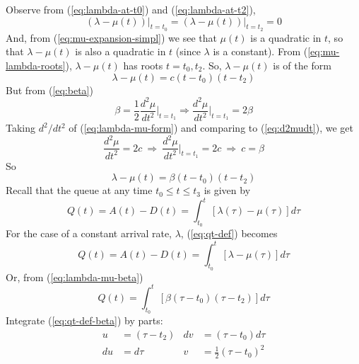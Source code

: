 \documentclass[12pt]{report}
\newcounter{time}
\begin{document}
Observe from (\ref{eq:lambda-at-t0}) and (\ref{eq:lambda-at-t2}),
\begin{equation}
  \label{eq:mu-lambda-roots}
  (\lambda - \mu(t))\rvert_{t=t_0} = (\lambda - \mu(t))\rvert_{t=t_2} = 0
\end{equation}
And, from (\ref{eq:mu-expansion-simpl}) we see that $\mu(t)$ is a quadratic in $t$,
so that $\lambda-\mu(t)$ is also a quadratic in $t$ (since $\lambda$
is a constant).  From (\ref{eq:mu-lambda-roots}), $\lambda - \mu(t)$ has
roots $t=t_0,t_2$.  So, $\lambda - \mu(t)$ is of the form
\begin{equation}
  \label{eq:lambda-mu-form}
  \lambda-\mu(t) = c(t-t_0)(t-t_2)
\end{equation}
But from (\ref{eq:beta})
\begin{equation}
  \label{eq:d2mudt}
  \beta = \frac{1}{2}\frac{d^2\mu}{dt^2}\Biggr\rvert_{t=t_1}
  \Rightarrow \frac{d^2\mu}{dt^2}\Biggr\rvert_{t=t_1} = 2\beta
\end{equation}
Taking ${d^2}/{dt^2}$ of (\ref{eq:lambda-mu-form}) and comparing
to (\ref{eq:d2mudt}), we get
\begin{equation*}
  \frac{d^2\mu}{dt^2} = 2c \:\Rightarrow\:
  \frac{d^2\mu}{dt^2}\Biggr\rvert_{t=t_1}=2c \:\Rightarrow\: c = \beta
\end{equation*}
So
\begin{equation}
  \label{eq:lambda-mu-beta}
  \lambda - \mu(t) = \beta(t-t_0)(t-t_2)
\end{equation}
Recall that the queue at any time $t_0 \le t \le t_3$  is given by
\begin{equation}
  \label{eq:qt-def}
  Q(t)=A(t)-D(t)=\int_{t_0}^t\left[\lambda(\tau)-\mu(\tau)\right]d\tau
\end{equation}
For the case of a constant arrival rate, $\lambda$, (\ref{eq:qt-def})
becomes
\begin{equation}
  \label{eq:qt-def-2}
  Q(t)=A(t)-D(t)=\int_{t_0}^t\left[\lambda-\mu(\tau)\right]d\tau
\end{equation}
Or, from (\ref{eq:lambda-mu-beta})
\begin{equation}
  \label{eq:qt-def-beta}
  Q(t)=\int_{t_0}^t\left[\beta(\tau-t_0)(\tau-t_2)\right]d\tau
\end{equation}
Integrate (\ref{eq:qt-def-beta}) by parts:
\begin{align*}
  u & = (\tau-t_2) & dv & = (\tau-t_0)d\tau\\
  du & = d\tau & v & = \frac{1}{2}(\tau - t_0)^2
\end{align*}
\end{document}
